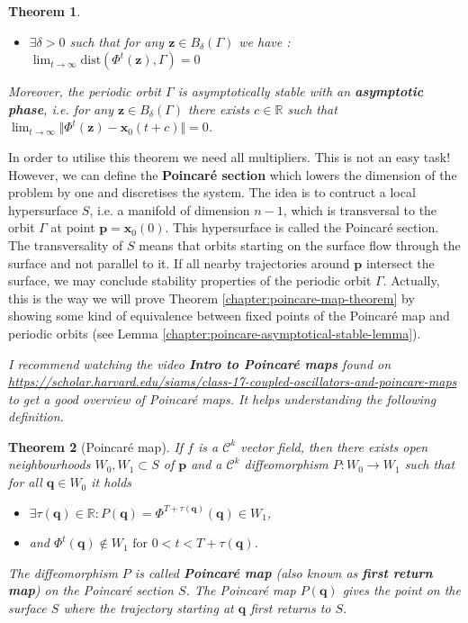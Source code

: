 \documentclass[hidelinks,a4paper, 11pt]{article}
\theoremstyle{plain}
\newtheorem{theorem}{Theorem}
\theoremstyle{break}
\theoremstyle{plain}
\theoremstyle{definition}
\begin{document}
{\begin{theorem}
\begin{itemize}
		\item $\exists \delta > 0$ such that for any $\mathbf z \in B_{\delta}(\Gamma)$ we have : $\lim_{t \to \infty} \mathrm{dist}(\Phi^t(\mathbf z), \Gamma) = 0$
	\end{itemize}
	Moreover, the periodic orbit $\Gamma$ is asymptotically stable with an \textbf{asymptotic phase}, i.e. for any $\mathbf z \in B_{\delta}(\Gamma)$ there exists $c \in \mathbb R$ such that $\lim_{t \to \infty} \Vert \Phi^t(\mathbf z) - \mathbf x_0(t+c)\Vert = 0$.
\end{theorem}

In order to utilise this theorem we need all multipliers. This is not an easy task! However, we can define the \textbf{Poincaré section} which lowers the dimension of the problem by one and discretises the system. The idea is to contruct a local hypersurface $S$, i.e. a manifold of dimension $n-1$, which is transversal to the orbit $\Gamma$ at point $\mathbf p = \mathbf x_0(0)$. This hypersurface is called the Poincaré section. The transversality of $S$ means that orbits starting on the surface flow through the surface and not parallel to it. If all nearby trajectories around $\mathbf p$ intersect the surface, we may conclude stability properties of the periodic orbit $\Gamma$. Actually, this is the way we will prove Theorem \ref{chapter:poincare-map-theorem} by showing some kind of equivalence between fixed points of the Poincaré map and periodic orbits (see Lemma \ref{chapter:poincare-asymptotical-stable-lemma}).

\textit{I recommend watching the video \emph{\textbf{Intro to Poincaré maps}} found on \url{https://scholar.harvard.edu/siams/class-17-coupled-oscillators-and-poincare-maps} to get a good overview of Poincaré maps. It helps understanding the following definition.}


\begin{theorem}[Poincaré map]
	If $f$ is a $\mathcal C^k$ vector field, then there exists open neighbourhoods $W_0, W_1 \subset S$ of $\mathbf p$ and a $\mathcal C^k$ diffeomorphism $P: W_0 \to W_1$ such that for all $\mathbf q \in W_0$ it holds
	\begin{itemize}
		\item $\exists \tau(\mathbf q) \in \mathbb R: P(\mathbf q) = \Phi^{T+\tau(\mathbf q)}(\mathbf q) \in W_1$,
		\item and $ \Phi^t(\mathbf q) \notin W_1 \text{ for } 0 < t < T+ \tau(\mathbf q)$.
	\end{itemize}
	The diffeomorphism $P$ is called \textbf{Poincaré map} (also known as \textbf{first return map}) on the Poincaré section $S$. The Poincaré map $P(\mathbf q)$ gives the point on the surface $S$ where the trajectory starting at $\mathbf q$ first returns to $S$.
\end{theorem}

}
\end{document}
